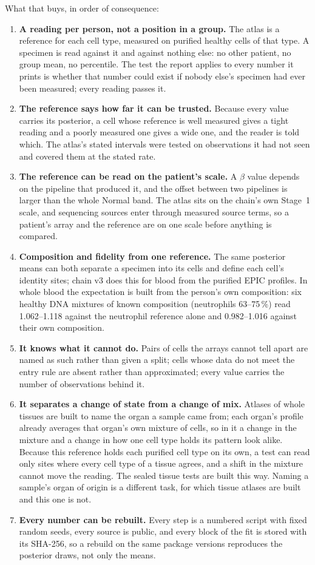 What that buys, in order of consequence:
\begin{enumerate}
\item \textbf{A reading per person, not a position in a group.} The atlas is a reference for each cell type, measured on purified healthy
cells of that type. A specimen is read against it and against nothing else: no other patient, no group mean, no percentile. The test the report
applies to every number it prints is whether that number could exist if nobody else's specimen had ever been measured; every reading passes it.
\item \textbf{The reference says how far it can be trusted.} Because every value carries its posterior, a cell whose reference is well measured
gives a tight reading and a poorly measured one gives a wide one, and the reader is told which. The atlas's stated intervals were tested on
observations it had not seen and covered them at the stated rate. \measured
\item \textbf{The reference can be read on the patient's scale.} A $\beta$ value depends on the pipeline that produced it, and the offset
between two pipelines is larger than the whole Normal band. The atlas sits on the chain's own Stage~1 scale, and sequencing sources enter
through measured source terms, so a patient's array and the reference are on one scale before anything is compared. \measured
\item \textbf{Composition and fidelity from one reference.} The same posterior means can both separate a specimen into its cells and define each
cell's identity sites; chain v3 does this for blood from the purified EPIC profiles. In whole blood the expectation is built from the person's own composition: six healthy DNA mixtures of known composition (neutrophils
63--75\,\%) read 1.062--1.118 against the neutrophil reference alone and 0.982--1.016 against their own composition. \measured
\item \textbf{It knows what it cannot do.} Pairs of cells the arrays cannot tell apart are named as such rather than given a split; cells whose
data do not meet the entry rule are absent rather than approximated; every
value carries the number of observations behind it.
\item \textbf{It separates a change of state from a change of mix.} Atlases of whole tissues are built to name the organ a sample came
from; each organ's profile already averages that organ's own mixture of cells, so in it a change in the mixture and a change in how one cell
type holds its pattern look alike. Because this reference holds each purified cell type on its own, a test can read only sites where every
cell type of a tissue agrees, and a shift in the mixture cannot move the reading. The sealed tissue tests are built this way. Naming a
sample's organ of origin is a different task, for which tissue atlases are built and this one is not.
\item \textbf{Every number can be rebuilt.} Every step is a numbered script with fixed random seeds, every source is public, and every block
of the fit is stored with its SHA-256, so a rebuild on the same package versions reproduces the posterior draws, not only the means.
\end{enumerate}

